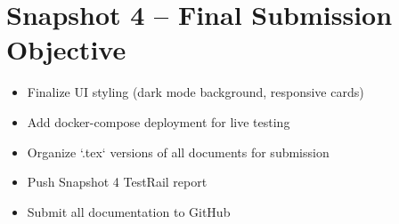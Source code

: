 \documentclass[12pt]{article}
\begin{document}
\section{Snapshot 4 – Final Submission Objective}
\begin{itemize}
  \item Finalize UI styling (dark mode background, responsive cards)
  \item Add docker-compose deployment for live testing
  \item Organize `.tex` versions of all documents for submission
  \item Push Snapshot 4 TestRail report
  \item Submit all documentation to GitHub
\end{itemize}
\end{document}
